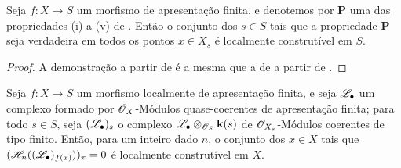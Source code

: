 \begin{corollary}[9.9.5]
\label{IV.9.9.5}
Seja $f:X\to S$ um morfismo de apresentação finita, e denotemos por $\mathbf{P}$ uma das propriedades (i) a (v) de .
Então o conjunto dos $s\in S$ tais que a propriedade $\mathbf{P}$ seja verdadeira em todos os pontos $x\in X_s$ é localmente construtível em $S$.
\end{corollary}

\begin{proof}
\label{IV.9.9.5-proof}
A demonstração a partir de  é a mesma que a de  a partir de .
\end{proof}

\begin{proposition}[9.9.6]
\label{IV.9.9.6}
Seja $f:X\to S$ um morfismo localmente de apresentação finita, e seja $\mathscr{L}_\bullet$ um complexo formado por $\mathscr{O}_X$-Módulos quase-coerentes de apresentação finita; para todo $s\in S$, seja $(\mathscr{L}_\bullet)_s$ o complexo $\mathscr{L}_\bullet\otimes_{\mathscr{O}_S}\mathbf{k}(s)$ de $\mathscr{O}_{X_s}$-Módulos coerentes de tipo finito.
Então, para um inteiro dado $n$, o conjunto dos $x\in X$ tais que $(\mathscr{H}_n((\mathscr{L}_\bullet)_{f(x)}))_x=0$ é localmente construtível em $X$.
\end{proposition}

